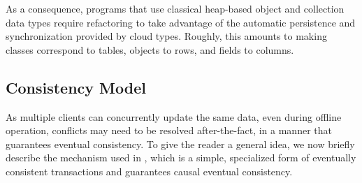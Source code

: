 \documentclass[preprint]{sigplanconf}
\begin{document}
As a consequence, programs that use
classical heap-based object and collection data types require refactoring to
take advantage of the automatic persistence and synchronization provided by
cloud types. Roughly, this amounts to making classes correspond to tables,
objects to rows, and fields to columns. 

\subsection{Consistency Model}

As multiple clients can concurrently update the same data, even during offline operation, conflicts may need to be resolved after-the-fact, in a manner that guarantees eventual consistency. To give the reader a general idea, we now briefly describe the mechanism used in \TD, which is a simple, specialized form of eventually consistent transactions \cite{burckhardt2012ect} and guarantees causal eventual consistency. 
\end{document}
